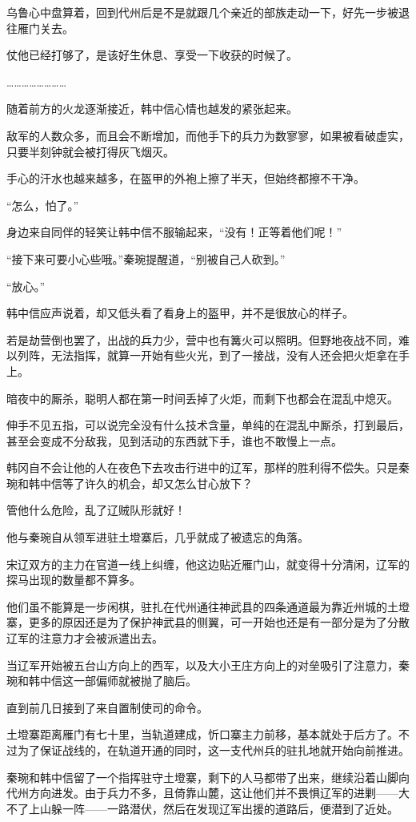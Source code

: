 乌鲁心中盘算着，回到代州后是不是就跟几个亲近的部族走动一下，好先一步被退往雁门关去。

仗他已经打够了，是该好生休息、享受一下收获的时候了。

……………………

随着前方的火龙逐渐接近，韩中信心情也越发的紧张起来。

敌军的人数众多，而且会不断增加，而他手下的兵力为数寥寥，如果被看破虚实，只要半刻钟就会被打得灰飞烟灭。

手心的汗水也越来越多，在盔甲的外袍上擦了半天，但始终都擦不干净。

“怎么，怕了。”

身边来自同伴的轻笑让韩中信不服输起来，“没有！正等着他们呢！”

“接下来可要小心些哦。”秦琬提醒道，“别被自己人砍到。”

“放心。”

韩中信应声说着，却又低头看了看身上的盔甲，并不是很放心的样子。

若是劫营倒也罢了，出战的兵力少，营中也有篝火可以照明。但野地夜战不同，难以列阵，无法指挥，就算一开始有些火光，到了一接战，没有人还会把火炬拿在手上。

暗夜中的厮杀，聪明人都在第一时间丢掉了火炬，而剩下也都会在混乱中熄灭。

伸手不见五指，可以说完全没有什么技术含量，单纯的在混乱中厮杀，打到最后，甚至会变成不分敌我，见到活动的东西就下手，谁也不敢慢上一点。

韩冈自不会让他的人在夜色下去攻击行进中的辽军，那样的胜利得不偿失。只是秦琬和韩中信等了许久的机会，却又怎么甘心放下？

管他什么危险，乱了辽贼队形就好！

他与秦琬自从领军进驻土墱寨后，几乎就成了被遗忘的角落。

宋辽双方的主力在官道一线上纠缠，他这边贴近雁门山，就变得十分清闲，辽军的探马出现的数量都不算多。

他们虽不能算是一步闲棋，驻扎在代州通往神武县的四条通道最为靠近州城的土墱寨，更多的原因还是为了保护神武县的侧翼，可一开始也还是有一部分是为了分散辽军的注意力才会被派遣出去。

当辽军开始被五台山方向上的西军，以及大小王庄方向上的对垒吸引了注意力，秦琬和韩中信这一部偏师就被抛了脑后。

直到前几日接到了来自置制使司的命令。

土墱寨距离雁门有七十里，当轨道建成，忻口寨主力前移，基本就处于后方了。不过为了保证战线的，在轨道开通的同时，这一支代州兵的驻扎地就开始向前推进。

秦琬和韩中信留了一个指挥驻守土墱寨，剩下的人马都带了出来，继续沿着山脚向代州方向进发。由于兵力不多，且倚靠山麓，这让他们并不畏惧辽军的进剿——大不了上山躲一阵——一路潜伏，然后在发现辽军出援的道路后，便潜到了近处。

